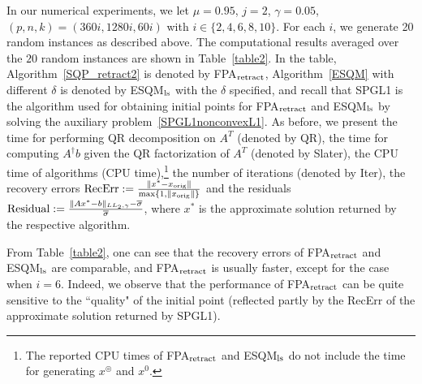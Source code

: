 \documentclass[10pt]{article}
\numberwithin{equation}{section}
\def\xorig{{x_{\rm orig}}}
\def\xfeasss{x^\circledcirc}
\begin{document}
In our numerical experiments, we let $\mu =0.95$, $j = 2$, $\gamma = 0.05$, {\color{blue} $(p,n,k) = (360i,1280i,60i)$ }with $i\in \{2, 4, 6, 8, 10\}$. For each $i$, we generate {\color{blue}20 random instances} as described above. The computational results averaged over the {\color{blue} $20$ random instances} are shown in Table~\ref{table2}. In the table, Algorithm~\ref{SQP_retract2} is denoted by FPA$_{\rm retract}$, Algorithm~\ref{ESQM} with different $\delta$ is denoted by ESQM$_{\rm ls}$ with the $\delta$ specified, and recall that SPGL1 is the algorithm used for obtaining initial points for FPA$_{\rm retract}$ and ESQM$_{\rm ls}$ by solving the auxiliary problem~\eqref{SPGL1nonconvexL1}. As before, we present the time for performing QR decomposition on $A^T$ (denoted by QR), the time for computing $A^\dagger b$ given the QR factorization of $A^T$ (denoted by Slater), the CPU time of algorithms (CPU time),\footnote{The reported CPU times of FPA$_{\rm retract}$ and ESQM$_{\rm ls}$ do not include the time for generating $\xfeasss$ and $x^0$.} the number of iterations (denoted by Iter), the recovery errors $\text{RecErr} := \frac{\|x^* - \xorig\|}{\max\{1, \|\xorig\|\}}$ and the residuals ${\rm Residual} := \frac{\|Ax^* - b\|_{LL_2,\gamma} - \overline{\sigma} }{\overline{\sigma}}$, where $x^*$ is the approximate solution returned by the respective algorithm.

From Table~\ref{table2}, one can see that the recovery errors of FPA$_{\rm retract}$ and ESQM$_{\rm ls}$ are comparable, and FPA$_{\rm retract}$ is usually faster, except for the case when {\color{blue}$i = 6$}.
Indeed, we observe that the performance of FPA$_{\rm retract}$ can be quite sensitive to the ``quality" of the initial point (reflected partly by the RecErr of the approximate solution returned by SPGL1).

\end{document}
